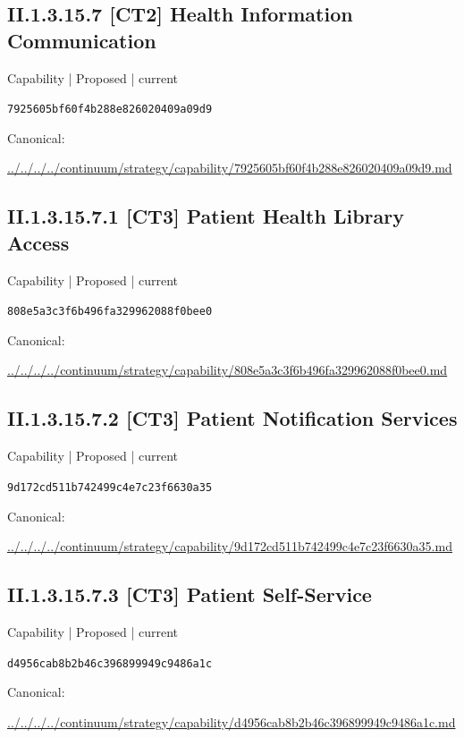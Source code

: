 \documentclass[10pt,a4paper]{article}
\begin{document}
\subsection*{II.1.3.15.7 [CT2] Health Information Communication}
{\small Capability | Proposed | current}\par
\texttt{7925605bf60f4b288e826020409a09d9}\par
Canonical: \par
{\footnotesize\url{../../../../continuum/strategy/capability/7925605bf60f4b288e826020409a09d9.md}}\par
\subsection*{II.1.3.15.7.1 [CT3] Patient Health Library Access}
{\small Capability | Proposed | current}\par
\texttt{808e5a3c3f6b496fa329962088f0bee0}\par
Canonical: \par
{\footnotesize\url{../../../../continuum/strategy/capability/808e5a3c3f6b496fa329962088f0bee0.md}}\par
\subsection*{II.1.3.15.7.2 [CT3] Patient Notification Services}
{\small Capability | Proposed | current}\par
\texttt{9d172cd511b742499c4e7c23f6630a35}\par
Canonical: \par
{\footnotesize\url{../../../../continuum/strategy/capability/9d172cd511b742499c4e7c23f6630a35.md}}\par
\subsection*{II.1.3.15.7.3 [CT3] Patient Self-Service}
{\small Capability | Proposed | current}\par
\texttt{d4956cab8b2b46c396899949c9486a1c}\par
Canonical: \par
{\footnotesize\url{../../../../continuum/strategy/capability/d4956cab8b2b46c396899949c9486a1c.md}}\par
\end{document}
